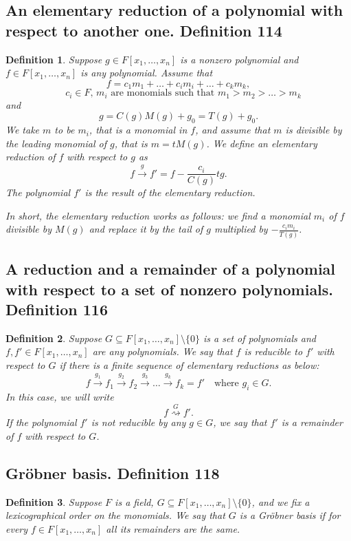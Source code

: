 \documentclass{article}
\newtheorem*{customdefinition}{Definition}
\begin{document}
\pagebreak

\subsection*{An elementary reduction of a polynomial with respect to another one. Definition 114}
\begin{customdefinition}
Suppose \( g \in F[x_1, \ldots, x_n] \) is a nonzero polynomial and \( f \in F[x_1, \ldots, x_n] \) is any polynomial. Assume that
\[
f = c_1 m_1 + \ldots + c_i m_i + \ldots + c_k m_k, 
\]
\[
    \quad c_i \in F, \, m_i \text{ are monomials such that } m_1 > m_2 > \ldots > m_k
\]
and
\[
g = C(g)M(g) + g_0 = T(g) + g_0.
\]
We take \( m \) to be \( m_i \), that is a monomial in \( f \), and assume that \( m \) is divisible by the leading monomial of \( g \), that is \( m = tM(g) \). We define an elementary reduction of \( f \) with respect to \( g \) as
\[
f \xrightarrow{g} f' = f - \frac{c_i}{C(g)} t g.
\]
The polynomial \( f' \) is the result of the elementary reduction.

In short, the elementary reduction works as follows: we find a monomial \( m_i \) of \( f \) divisible by \( M(g) \) and replace it by the tail of \( g \) multiplied by \( -\frac{c_i m_i}{T(g)} \).
\end{customdefinition}

\subsection*{A reduction and a remainder of a polynomial with respect to a set of nonzero polynomials. Definition 116}
\begin{customdefinition}
Suppose \( G \subseteq F[x_1, \ldots, x_n] \setminus \{0\} \) is a set of polynomials and \( f, f' \in F[x_1, \ldots, x_n] \) are any polynomials. We say that \( f \) is reducible to \( f' \) with respect to \( G \) if there is a finite sequence of elementary reductions as below:
\[
f \xrightarrow{g_1} f_1 \xrightarrow{g_2} f_2 \xrightarrow{g_3} \ldots \xrightarrow{g_k} f_k = f' \quad \text{where } g_i \in G.
\]
In this case, we will write 
\[
f \stackrel{G}{\rightsquigarrow} f'.
\]
If the polynomial \( f' \) is not reducible by any \( g \in G \), we say that \( f' \) is a remainder of \( f \) with respect to \( G \).
\end{customdefinition}



\subsection*{Gröbner basis. Definition 118}
\begin{customdefinition}
Suppose \( F \) is a field, \( G \subseteq F[x_1, \ldots, x_n] \setminus \{0\} \), and we fix a lexicographical order on the monomials. We say that \( G \) is a Gröbner basis if for every \( f \in F[x_1, \ldots, x_n] \) all its remainders are the same.
\end{customdefinition}
\end{document}
